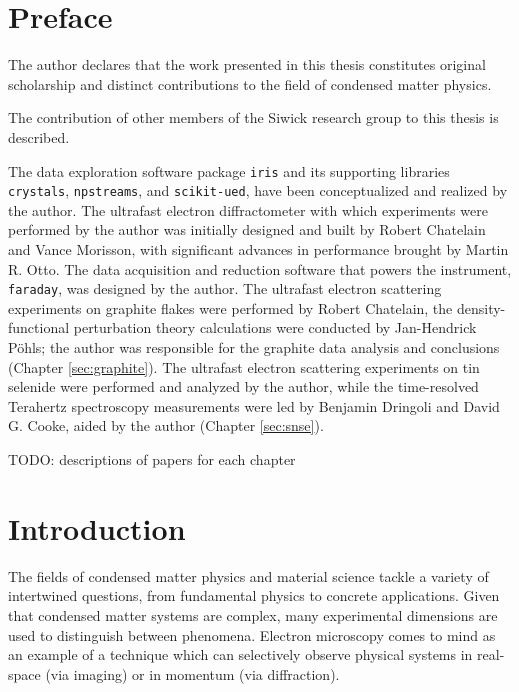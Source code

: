 \documentclass[
  11pt,
  canadian,
  a4paper,
  open=right,
  twoside=true,
  cleardoublepage=empty,
  clearpage=empty]{scrbook}
\begin{document}
\listoftables

\hypertarget{sec:preface}{%
\chapter*{Preface}\label{sec:preface}}

The author declares that the work presented in this thesis constitutes
original scholarship and distinct contributions to the field of condensed matter physics.

The contribution of other members of the Siwick research group to this thesis is described.

The data exploration software package \texttt{iris} and its supporting libraries \texttt{crystals}, \texttt{npstreams}, and \texttt{scikit-ued}, have been conceptualized and realized by the author. The ultrafast electron diffractometer with which experiments were performed by the author was initially designed and built by Robert Chatelain and Vance Morisson, with significant advances in performance brought by Martin R. Otto. The data acquisition and reduction software that powers the instrument, \texttt{faraday}, was designed by the author. The ultrafast electron scattering experiments on graphite flakes were performed by Robert Chatelain, the density-functional perturbation theory calculations were conducted by Jan-Hendrick Pöhls; the author was responsible for the graphite data analysis and conclusions (Chapter \ref{sec:graphite}). The ultrafast electron scattering experiments on tin selenide were performed and analyzed by the author, while the time-resolved Terahertz spectroscopy measurements were led by Benjamin Dringoli and David G. Cooke, aided by the author (Chapter \ref{sec:snse}).

TODO: descriptions of papers for each chapter

\hypertarget{sec:introduction}{%
\chapter{Introduction}\label{sec:introduction}}

The fields of condensed matter physics and material science tackle a variety of intertwined questions, from fundamental physics to concrete applications. Given that condensed matter systems are complex, many experimental dimensions are used to distinguish between phenomena. Electron microscopy comes to mind as an example of a technique which can selectively observe physical systems in real-space (via imaging) or in momentum (via diffraction).
\end{document}
